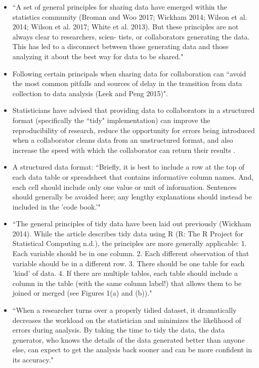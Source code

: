 \documentclass[pdftex,english,11pt,parskip=half]{scrartcl}
\begin{document}
\begin{itemize}
\item ``A set of general principles for sharing data have emerged within the statistics community (Broman and Woo 2017; Wickham 2014; Wilson et al. 2014; Wilson et al. 2017; White et al. 2013). But these principles are not always clear to researchers, scien- tists, or collaborators generating the data. This has led to a disconnect between those generating data and those analyzing it about the best way for data to be shared." \cite{ellis2018share} 
\item Following certain principals when sharing data for collaboration can ``avoid the most common pitfalls and sources of delay in the transition from data collection to data analysis (Leek and Peng 2015)". \cite{ellis2018share} 
\item Statisticians have advised that providing data to collaborators in a structured format (specifically the ``tidy" implementation) can improve the reproducibility of research, reduce the opportunity for errors being introduced when a collaborator cleans data from an unstructured format, and also increase the speed with which the collaborator can return their results \cite{ellis2018share}. 
\item A structured data format: ``Briefly, it is best to include a row at the top of each data table or spreadsheet that contains informative column names. And, each cell should include only one value or unit of information. Sentences should generally be avoided here; any lengthy explanations should instead be included in the 'code book.'" \cite{ellis2018share} 
\item ``The general principles of tidy data have been laid out previously (Wickham 2014). While the article describes tidy data using R (R: The R Project for Statistical Computing n.d.), the principles are more generally applicable:
1. Each variable should be in one column.
2. Each different observation of that variable should be in a
different row.
3. There should be one table for each 'kind' of data.
4. If there are multiple tables, each table should include a
column in the table (with the same column label!) that allows them to be joined or merged (see Figures 1(a) and (b))." \cite{ellis2018share}
\item ``When a researcher turns over a properly tidied dataset, it dramatically decreases the workload on the statistician and minimizes the likelihood of errors during analysis. By taking the time to tidy the data, the data generator, who knows the details of the data generated better than anyone else, can expect to get the analysis back sooner and can be more confident in its accuracy." \cite{ellis2018share}

\end{itemize}
\end{document}
